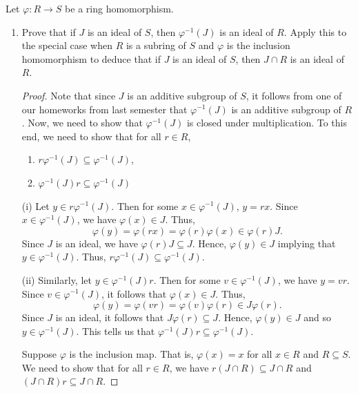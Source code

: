 \documentclass[a4paper]{article}
\begin{document}
\begin{problem}
    Let \( \varphi : R \to S  \) be a ring homomorphism.
    \begin{enumerate}
        \item[(a)] Prove that if \( J  \) is an ideal of \( S  \), then \( \varphi^{-1}(J) \) is an ideal of \( R  \). Apply this to the special case when \( R  \) is a subring of \( S  \) and \( \varphi  \) is the inclusion homomorphism to deduce that if \( J  \) is an ideal of \( S  \), then \( J \cap R  \) is an ideal of \( R  \).
            \begin{proof}
            Note that since \( J  \) is an additive subgroup of \( S  \), it follows from one of our homeworks from last semester that \( \varphi^{-1}(J)  \) is an additive subgroup of \( R  \). Now, we need to show that \( \varphi^{-1}(J) \) is closed under multiplication. To this end, we need to show that for all \( r \in R  \), 
            \begin{enumerate}
                \item[(i)] \( r \varphi^{-1}(J) \subseteq \varphi^{-1}(J) \),
                \item[(ii)] \( \varphi^{-1}(J) r \subseteq \varphi^{-1}(J) \)
            \end{enumerate}
            (i) Let \( y \in r \varphi^{-1}(J) \). Then for some \( x \in \varphi^{-1}(J) \), \( y = rx \). Since \( x \in \varphi^{-1}(J) \), we have \( \varphi(x) \in J \). Thus,
            \[  \varphi(y) = \varphi(rx) = \varphi(r) \varphi(x) \in \varphi(r) J. \]
            Since \( J  \) is an ideal, we have \( \varphi(r) J \subseteq J \). Hence, \( \varphi(y) \in J  \) implying that \( y \in \varphi^{-1}(J) \). Thus,  
           \( r \varphi^{-1}(J) \subseteq \varphi^{-1}(J) \). 

           (ii) Similarly, let \( y \in \varphi^{-1}(J) r  \). Then for some \( v \in \varphi^{-1}(J) \), we have \( y = vr \). Since \( v \in \varphi^{-1}(J)  \), it follows that \( \varphi(x) \in J \). Thus, 
           \[  \varphi(y) = \varphi(vr) = \varphi(v) \varphi(r) \in J \varphi(r).  \]
           Since \( J  \) is an ideal, it follows that \( J \varphi(r) \subseteq J  \). Hence, \( \varphi(y) \in J  \) and so \( y \in \varphi^{-1}(J) \). This tells us that 
           \( \varphi^{-1}(J) r \subseteq \varphi^{-1}(J). \)

           Suppose \( \varphi  \) is the inclusion map. That is, \( \varphi(x) = x  \) for all \( x \in R  \) and \( R \subseteq S  \). We need to show that for all \( r \in R  \), we have \( r(J \cap R ) \subseteq J \cap R  \) and \( (J \cap R ) r \subseteq J \cap R  \).


\end{proof}
\end{enumerate}
\end{problem}
\end{document}

